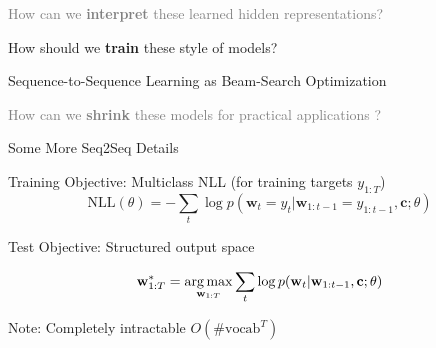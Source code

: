 \documentclass{beamer}
\let\tempone\itemize
\let\temptwo\enditemize
\renewenvironment{itemize}{\tempone\addtolength{\itemsep}{0.5\baselineskip}}{\temptwo}
\newcommand{\air}{\vspace{0.25cm}}
\newcommand{\wvec}{\mathbf{w}}
\newcommand{\cvec}{\mathbf{c}}
\newcommand{\Cite}[1]{{\footnotesize \citep{#1}}}
\def\argmax{\operatornamewithlimits{arg\,max}}
\def\argmax{\operatornamewithlimits{arg\,max}}
\begin{document}
\begin{frame}
  \centerline{}
  \air 
  \air

  \begin{itemize}
  \item \textcolor{gray}{How can we \textbf{interpret} these learned hidden representations? \Cite{Strobelt2016}}
    \air 
  \item  How should we \textbf{train} these style of models? 
    \air 

    \begin{center}
      \alert{Sequence-to-Sequence Learning as Beam-Search
        Optimization}

      \Cite{Wiseman2016a}
    \end{center}


    \air 
  \item \textcolor{gray}{ How can we \textbf{shrink} these models for practical applications \Cite{Kim2016a}? }
  \end{itemize}
\end{frame}

\begin{frame}
  \centerline{Some More Seq2Seq \alert{Details} }
  \air 
  \air

  Training Objective: Multiclass NLL (for training targets $y_{1:T}$)
  \[ \text{NLL}(\theta) = -\sum_{t} \log p(\wvec_{t} = y_t | \wvec_{1:t-1} = y_{1:t-1}, \cvec; \theta) \] 

  \air

  Test Objective: Structured output space

  \[ \wvec^*_{1:T} = \argmax_{\wvec_{1:T}} \sum_{t} \log p(\wvec_{t} | \wvec_{1:t-1}, \cvec; \theta) \] 
  \pause
  \begin{itemize}
  \item Note: Completely intractable $O(\text{\#vocab} ^T)$ 
  \end{itemize}
\end{frame}
\end{document}
